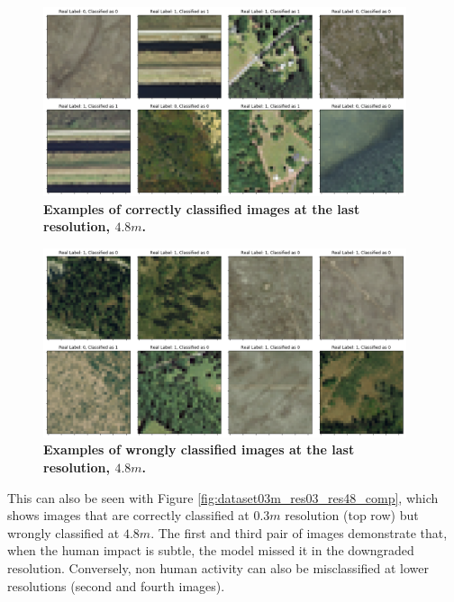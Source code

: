 \begin{figure}[H]
	\centering
	\captionsetup{width=1\linewidth}
	\includegraphics[width=0.95\textwidth]{Figures/results/class_dataset03m_res48_correct.png}
	\caption{\textbf{Examples of correctly classified images at the last resolution, $4.8m$.}}
	\label{fig:dataset03m_res48_correct}
\end{figure}

\begin{figure}[H]
	\centering
	\captionsetup{width=1\linewidth}
	\includegraphics[width=0.95\textwidth]{Figures/results/class_dataset03m_res48_wrong.png}
	\caption{\textbf{Examples of wrongly classified images at the last resolution, $4.8m$.}}
	\label{fig:dataset03m_res48_wrong}
\end{figure}

This can also be seen with Figure \ref{fig:dataset03m_res03_res48_comp}, which shows images that are correctly classified at $0.3m$ resolution (top row) but wrongly classified at $4.8m$. The first and third pair of images demonstrate that, when the human impact is subtle, the model missed it in the downgraded resolution. Conversely, non human activity can also be misclassified at lower resolutions (second and fourth images).

